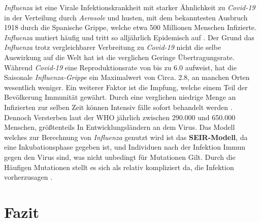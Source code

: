 \documentclass[12pt]{scrartcl} %
\begin{document}
\textsl{Influenza} ist eine Virale Infektionskrankheit mit starker Ähnlichkeit zu \textsl{Covid-19} in der Verteilung durch \textsl{Aerosole} und husten, mit dem bekanntesten Ausbruch 1918 durch die Spanische Grippe, welche etwa 500 Millionen Menschen Infizierte. \textsl{Influenza} mutiert häufig und tritt so alljährlich Epidemisch auf \cite{2, 3}. Der Grund das \textit{Influenza} trotz vergleichbarer Verbreitung zu \textsl{Covid-19} nicht die selbe Auswirkung auf die Welt hat ist die verglichen Geringe Übertragungsrate. Während \textsl{Covid-19} eine Reproduktionsrate von bis zu 6.0 aufweist, hat die Saisonale \textsl{Influenza-Grippe} ein Maximalwert von Circa. 2.8, an manchen Orten wesentlich weniger. Ein weiterer Faktor ist die Impfung, welche einem Teil der Bevölkerung Immunität gewährt. Durch eine verglichen niedrige Menge an Infizierten zur selben Zeit können Intensiv fälle sofort behandelt werden \cite{3}. Dennoch Versterben laut der WHO jährlich zwischen 290.000 und 650.000 Menschen, größtenteils In Entwicklungsländern an dem Virus. Das Modell welches zur Berechnung von \textsl{Influenza} genutzt wird ist das \textbf{SEIR-Modell}, da eine Inkubationsphase gegeben ist, und Individuen nach der Infektion Immun gegen den Virus sind, was nicht unbedingt für Mutationen Gilt. Durch die Häufigen Mutationen stellt es sich als relativ kompliziert da, die Infektion vorherzusagen \cite{11}.



\section{Fazit}
\end{document}
